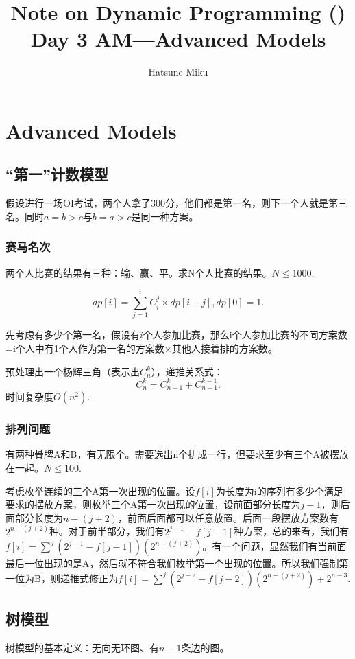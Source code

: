 \documentclass{article}
\newcommand{\romannum}[1]{\uppercase\expandafter{\romannumeral#1}}
\begin{document}
\title{Note on Dynamic Programming (\romannum{3})\\\large{Day 3 AM---Advanced Models}}\date{}\author{Hatsune Miku}
\maketitle
\section{Advanced Models}
\subsection{“第一”计数模型}
假设进行一场OI考试，两个人拿了300分，他们都是第一名，则下一个人就是第三名。同时$a=b>c$与$b=a>c$是同一种方案。
\subsubsection{赛马名次}
两个人比赛的结果有三种：输、赢、平。求N个人比赛的结果。$N\le 1000.$

\begin{equation*}
    dp[i]=\sum_{j=1}^i C_i^j\times dp[i-j],dp[0]=1.
\end{equation*}

先考虑有多少个第一名，假设有$i$个人参加比赛，那么i个人参加比赛的不同方案数=i个人中有1个人作为第一名的方案数$\times$其他人接着排的方案数。

预处理出一个杨辉三角（表示出$C_n^k$），递推关系式：
\begin{equation*}
    C_n^k=C_{n-1}^k+C_{n-1}^{k-1}.
\end{equation*}
时间复杂度$O(n^2)$.
\subsubsection{排列问题}
有两种骨牌A和B，有无限个。需要选出n个排成一行，但要求至少有三个A被摆放在一起。$N\le 100.$

考虑枚举连续的三个A第一次出现的位置。设$f[i]$为长度为i的序列有多少个满足要求的摆放方案，则枚举三个A第一次出现的位置，设前面部分长度为$j-1$，则后面部分长度为$n-(j+2)$，前面后面都可以任意放置。后面一段摆放方案数有$2^{n-(j+2)}$种。对于前半部分，我们有$2^{j-1}-f[j-1]$种方案，总的来看，我们有$f[i]=\sum^j(2^{j-1}-f[j-1])(2^{n-(j+2)})$。有一个问题，显然我们有当前面最后一位出现的是A，然后就不符合我们枚举第一个出现的位置。所以我们强制第一位为B，则递推式修正为$f[i]=\sum^j(2^{j-2}-f[j-2])(2^{n-(j+2)})+2^{n-3}$.
\subsection{树模型}
树模型的基本定义：无向无环图、有$n-1$条边的图。
\end{document}
